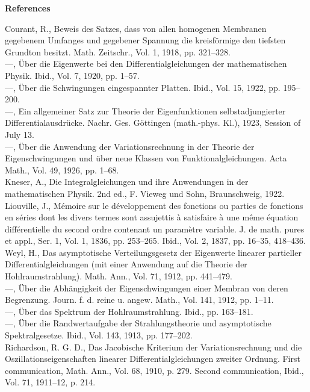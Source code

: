 \begin{center}
\textbf{References}
\end{center}
\noindent Courant, R., Beweis des Satzes, dass von allen homogenen Membranen gegebenem Umfanges und gegebener Spannung die kreisförmige den tiefsten Grundton besitzt. Math. Zeitschr., Vol. 1, 1918, pp. 321--328.\\
---, Über die Eigenwerte bei den Differentialgleichungen der mathematischen Physik. Ibid., Vol. 7, 1920, pp. 1--57.\\
---, Über die Schwingungen eingespannter Platten. Ibid., Vol. 15, 1922, pp. 195--200.\\
---, Ein allgemeiner Satz zur Theorie der Eigenfunktionen selbstadjungierter Differentialausdrücke. Nachr. Ges. Göttingen (math.-phys. Kl.), 1923, Session of July 13.\\
---, Über die Anwendung der Variationsrechnung in der Theorie der Eigenschwingungen und über neue Klassen von Funktionalgleichungen. Acta Math., Vol. 49, 1926, pp. 1--68.\\
Kneser, A., Die Integralgleichungen und ihre Anwendungen in der mathematischen Physik. 2nd ed., F. Vieweg und Sohn, Braunschweig, 1922.\\
Liouville, J., Mémoire sur le développement des fonctions ou parties de fonctions en séries dont les divers termes sont assujettis à satisfaire à une même équation différentielle du second ordre contenant un paramètre variable. J. de math. pures et appl., Ser. 1, Vol. 1, 1836, pp. 253--265. Ibid., Vol. 2, 1837, pp. 16--35, 418--436.\\
Weyl, H., Das asymptotische Verteilungsgesetz der Eigenwerte linearer partieller Differentialgleichungen (mit einer Anwendung auf die Theorie der Hohlraumstrahlung). Math. Ann., Vol. 71, 1912, pp. 441--479.\\
---, Über die Abhängigkeit der Eigenschwingungen einer Membran von deren Begrenzung. Journ. f. d. reine u. angew. Math., Vol. 141, 1912, pp. 1--11.\\
---, Über das Spektrum der Hohlraumstrahlung. Ibid., pp. 163--181.\\
---, Über die Randwertaufgabe der Strahlungstheorie und asymptotische Spektralgesetze. Ibid., Vol. 143, 1913, pp. 177--202.\\
Richardson, R. G. D., Das Jacobische Kriterium der Variationsrechnung und die Oszillationseigenschaften linearer Differentialgleichungen zweiter Ordnung. First communication, Math. Ann., Vol. 68, 1910, p. 279. Second communication, Ibid., Vol. 71, 1911--12, p. 214.\\
